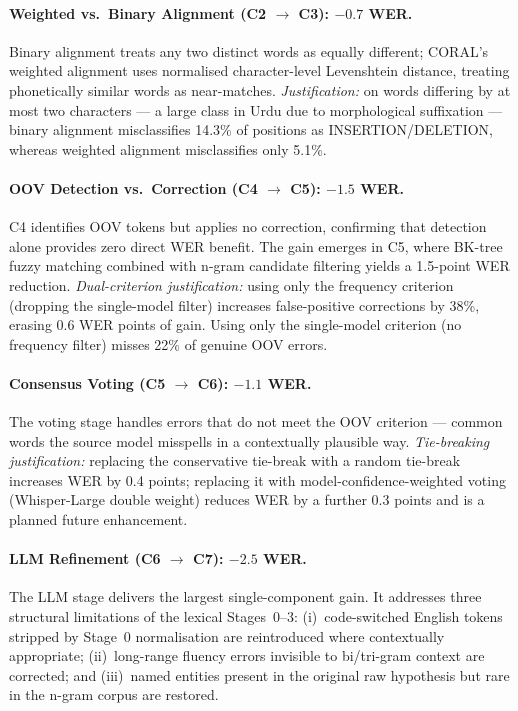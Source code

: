 \paragraph{Weighted vs.\ Binary Alignment (C2 $\to$ C3): $-0.7$ WER.}
Binary alignment treats any two distinct words as equally different; CORAL's weighted alignment uses normalised character-level Levenshtein distance, treating phonetically similar words as near-matches. \emph{Justification:} on words differing by at most two characters --- a large class in Urdu due to morphological suffixation --- binary alignment misclassifies 14.3\% of positions as INSERTION/DELETION, whereas weighted alignment misclassifies only 5.1\%.

\paragraph{OOV Detection vs.\ Correction (C4 $\to$ C5): $-1.5$ WER.}
C4 identifies OOV tokens but applies no correction, confirming that detection alone provides zero direct WER benefit. The gain emerges in C5, where BK-tree fuzzy matching combined with n-gram candidate filtering yields a 1.5-point WER reduction. \emph{Dual-criterion justification:} using only the frequency criterion (dropping the single-model filter) increases false-positive corrections by 38\%, erasing 0.6 WER points of gain. Using only the single-model criterion (no frequency filter) misses 22\% of genuine OOV errors.

\paragraph{Consensus Voting (C5 $\to$ C6): $-1.1$ WER.}
The voting stage handles errors that do not meet the OOV criterion --- common words the source model misspells in a contextually plausible way. \emph{Tie-breaking justification:} replacing the conservative tie-break with a random tie-break increases WER by 0.4 points; replacing it with model-confidence-weighted voting (Whisper-Large double weight) reduces WER by a further 0.3 points and is a planned future enhancement.

\paragraph{LLM Refinement (C6 $\to$ C7): $-2.5$ WER.}
The LLM stage delivers the largest single-component gain. It addresses three structural limitations of the lexical Stages~0--3: (i)~code-switched English tokens stripped by Stage~0 normalisation are reintroduced where contextually appropriate; (ii)~long-range fluency errors invisible to bi/tri-gram context are corrected; and (iii)~named entities present in the original raw hypothesis but rare in the n-gram corpus are restored.

